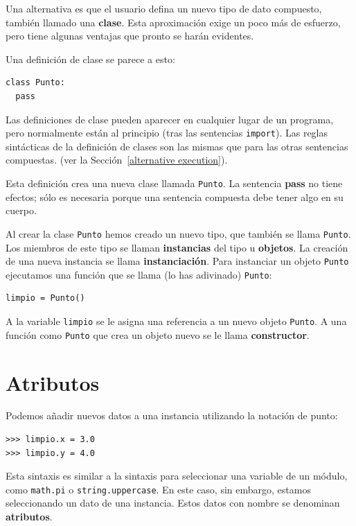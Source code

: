 
Una alternativa es que el usuario defina un nuevo tipo de dato compuesto, también
llamado una {\bf clase}. Esta aproximación exige un poco más de esfuerzo,
pero tiene algunas ventajas que pronto se harán evidentes.

Una definición de clase se parece a esto:

\beforeverb
\begin{verbatim}
class Punto:
  pass
\end{verbatim}
\afterverb
%
Las definiciones de clase pueden aparecer en cualquier lugar de un
programa, pero normalmente están al principio (tras las sentencias
\texttt{import}). Las reglas sintácticas de la definición de clases son
las mismas que para las otras sentencias compuestas. (ver la
Sección~\ref{alternative execution}).

Esta definición crea una nueva clase llamada \texttt{Punto}. La sentencia
{\bf pass} no tiene efectos; sólo es necesaria porque una sentencia
compuesta debe tener algo en su cuerpo.

Al crear la clase \texttt{Punto} hemos creado un nuevo tipo, que también
se llama \texttt{Punto}. Los miembros de este tipo se llaman {\bf instancias}
del tipo u {\bf objetos}. La creación de una nueva instancia se llama
{\bf instanciación}. Para instanciar un objeto \texttt{Punto} ejecutamos una
función que se llama (lo has adivinado) \texttt{Punto}:


\beforeverb
\begin{verbatim}
limpio = Punto()
\end{verbatim}
\afterverb
%
A la variable \texttt{limpio} se le asigna una referencia a un nuevo
objeto \texttt{Punto}. A una función como \texttt{Punto} que crea un
objeto nuevo se le llama {\bf constructor}.


\section{Atributos}

Podemos añadir nuevos datos a una instancia utilizando la notación de punto:

\beforeverb
\begin{verbatim}
>>> limpio.x = 3.0
>>> limpio.y = 4.0
\end{verbatim}
\afterverb
%
Esta sintaxis es similar a la sintaxis para seleccionar una variable de
un módulo, como \texttt{math.pi} o \texttt{string.uppercase}. En este caso,
sin embargo, estamos seleccionando un dato de una instancia. Estos datos
con nombre se denominan {\bf atributos}.


